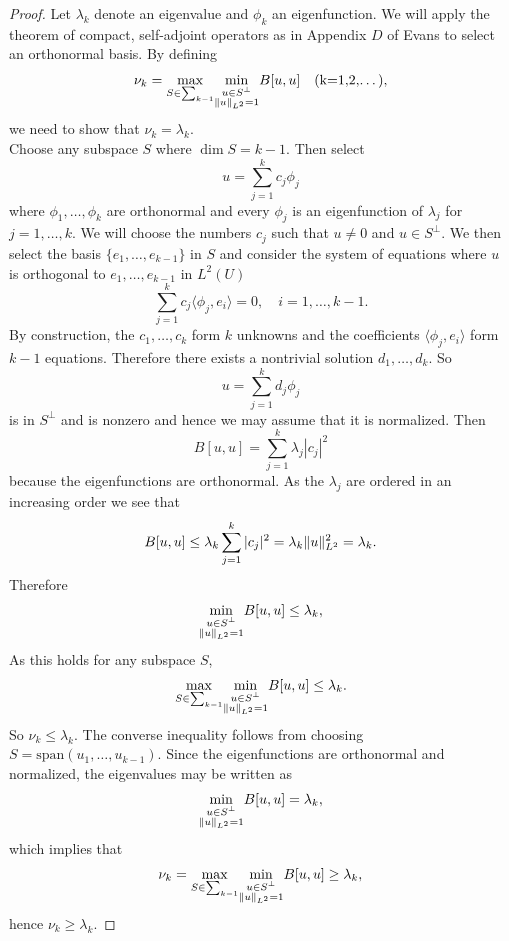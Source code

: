 \documentclass{article}
\DeclarePairedDelimiter{\norm}{\lVert}{\rVert}
\begin{document}
\begin{flushleft}
\begin{proof}
Let $\lambda_k$ denote an eigenvalue and $\phi_k$ an eigenfunction. We will apply the theorem of compact, self-adjoint operators as in Appendix $D$ of Evans to select an orthonormal basis. By defining
$$\nu_k= \underset{S\in \sum_{k-1}}{\max} \underset{\begin{subarray}{c}
  u\in S^{\perp} \\
  \norm{u}_{L^2}=1
  \end{subarray}}{\min}B[u,u]\quad \text{(k=1,2,\ldots),}$$
we need to show that $\nu_k = \lambda_k$.
\\
\bigskip
Choose any subspace $S$ where $\dim S=k-1$. Then select
$$u = \sum_{j=1}^k c_j\phi_j$$
where $\phi_1,\ldots,\phi_k$ are orthonormal and every $\phi_j$ is an eigenfunction of $\lambda_j$ for $j=1,\ldots,k$. We will choose the numbers $c_j$ such that $u\neq 0$ and $u\in S^{\perp}$. We then select the basis $\{e_1,\ldots,e_{k-1}\}$ in $S$ and consider the system of equations where $u$ is orthogonal to $e_1,\ldots,e_{k-1}$ in $L^2(U)$
$$\sum_{j=1}^k c_j\langle \phi_j,e_i\rangle=0,\quad i=1,\dots,k-1.$$
By construction, the $c_1,\ldots,c_k$ form $k$ unknowns and the coefficients $\langle \phi_j,e_i\rangle$ form $k-1$ equations. Therefore there exists a nontrivial solution $d_1,\ldots,d_k$. So
$$u=\sum_{j=1}^k d_j\phi_j$$
is in $S^{\perp}$ and is nonzero and hence we may assume that it is normalized. Then
$$B[u,u]=\sum_{j=1}^k \lambda_j |c_j|^2$$
because the eigenfunctions are orthonormal. As the $\lambda_j$ are ordered in an increasing order we see that
$$B[u,u]\le \lambda_k \sum_{j=1}^k |c_j|^2=\lambda_k \norm{u}_{L^2}^2=\lambda_k.$$
Therefore
$$\underset{\begin{subarray}{c}
  u\in S^{\perp} \\
  \norm{u}_{L^2}=1
  \end{subarray}}{\min}B[u,u]\le \lambda_k,$$
As this holds for any subspace $S$,
$$\underset{S\in \sum_{k-1}}{\max} \underset{\begin{subarray}{c}
  u\in S^{\perp} \\
  \norm{u}_{L^2}=1
  \end{subarray}}{\min}B[u,u]\le \lambda_k.$$
So $\nu_k\le \lambda_k$. The converse inequality follows from choosing $S=\text{span}(u_1,\ldots,u_{k-1}).$ Since the eigenfunctions are orthonormal and normalized, the eigenvalues may be written as 
$$\underset{\begin{subarray}{c}
  u\in S^{\perp} \\
  \norm{u}_{L^2}=1
  \end{subarray}}{\min}B[u,u]= \lambda_k,$$
 which implies that
 $$\nu_k=\underset{S\in \sum_{k-1}}{\max} \underset{\begin{subarray}{c}
  u\in S^{\perp} \\
  \norm{u}_{L^2}=1
  \end{subarray}}{\min}B[u,u]\ge \lambda_k,$$
hence $\nu_k \ge \lambda_k$.
\end{proof}

\end{flushleft}
\end{document}
